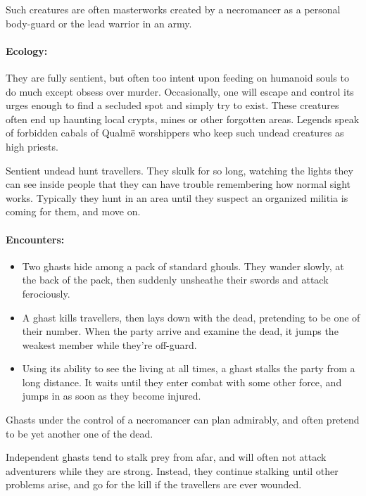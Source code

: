 \begin{multicols}{2}
Such creatures are often masterworks created by a necromancer as a personal body-guard or the lead warrior in an army.


\paragraph{Ecology:} They are fully sentient, but often too intent upon feeding on humanoid souls to do much except obsess over murder.
Occasionally, one will escape and control its urges enough to find a secluded spot and simply try to exist.
These creatures often end up haunting local crypts, mines or other forgotten areas.
Legends speak of forbidden cabals of Qualm\"{e} worshippers who keep such undead creatures as high priests.

Sentient undead hunt travellers.  They skulk for so long, watching the lights they can see inside people that they can have trouble remembering how normal sight works.  Typically they hunt in an area until they suspect an organized militia is coming for them, and move on.

\paragraph{Encounters:}

\begin{itemize}

  \item
  Two ghasts hide among a pack of standard ghouls.
  They wander slowly, at the back of the pack, then suddenly unsheathe their swords and attack ferociously.
  \item
  A ghast kills travellers, then lays down with the dead, pretending to be one of their number.
  When the party arrive and examine the dead, it jumps the weakest member while they're off-guard.
  \item
  Using its ability to see the living at all times, a ghast stalks the party from a long distance.
  It waits until they enter combat with some other force, and jumps in as soon as they become injured.

\end{itemize}

Ghasts under the control of a necromancer can plan admirably, and often pretend to be yet another one of the dead.

Independent ghasts tend to stalk prey from afar, and will often not attack adventurers while they are strong.
Instead, they continue stalking until other problems arise, and go for the kill if the travellers are ever wounded.

\end{multicols}

